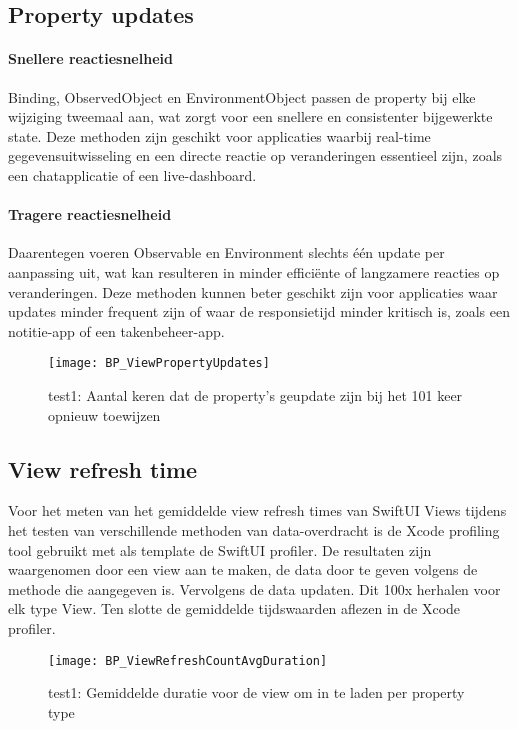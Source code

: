 \newpage
\subsection{Property updates}
\paragraph{Snellere reactiesnelheid}
Binding, ObservedObject en EnvironmentObject passen de property bij elke wijziging tweemaal aan, wat zorgt voor een snellere en consistenter bijgewerkte state. Deze methoden zijn geschikt voor applicaties waarbij real-time gegevensuitwisseling en een directe reactie op veranderingen essentieel zijn, zoals een chatapplicatie of een live-dashboard.

\paragraph{Tragere reactiesnelheid}
Daarentegen voeren Observable en Environment slechts één update per aanpassing uit, wat kan resulteren in minder efficiënte of langzamere reacties op veranderingen. Deze methoden kunnen beter geschikt zijn voor applicaties waar updates minder frequent zijn of waar de responsietijd minder kritisch is, zoals een notitie-app of een takenbeheer-app.


\begin{figure}[H]
    \centering
    \texttt{[image: BP\_ViewPropertyUpdates]} 
    \caption{test1: Aantal keren dat de property's geupdate zijn bij het 101 keer opnieuw toewijzen}
    \label{fig:propertyUpdates}
\end{figure}

\newpage
\subsection{View refresh time}
Voor het meten van het gemiddelde view refresh times van SwiftUI Views tijdens het testen van verschillende methoden van data-overdracht is de Xcode profiling tool gebruikt met als template de SwiftUI profiler. De resultaten zijn waargenomen door een view aan te maken, de data door te geven volgens de methode die aangegeven is. Vervolgens de data updaten. Dit 100x herhalen voor elk type View. Ten slotte de gemiddelde tijdswaarden aflezen in de Xcode profiler.

\begin{figure}[H]
    \centering
    \texttt{[image: BP\_ViewRefreshCountAvgDuration]} 
    \caption{test1: Gemiddelde duratie voor de view om in te laden per property type}
    \label{fig:propertyRefreshDuration}
\end{figure}

